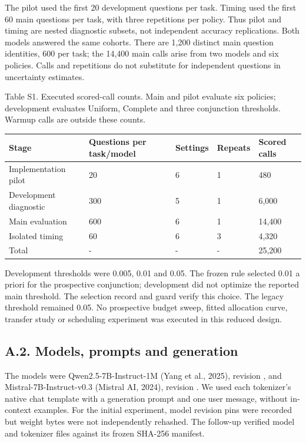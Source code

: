 \documentclass[
  12pt,
  a4paper,
]{article}
\begin{document}
The pilot used the first 20 development questions per task. Timing used
the first 60 main questions per task, with three repetitions per policy.
Thus pilot and timing are nested diagnostic subsets, not independent
accuracy replications. Both models answered the same cohorts. There are
1,200 distinct main question identities, 600 per task; the 14,400 main
calls arise from two models and six policies. Calls and repetitions do
not substitute for independent questions in uncertainty estimates.

Table S1. Executed scored-call counts. Main and pilot evaluate six
policies; development evaluates Uniform, Complete and three conjunction
thresholds. Warmup calls are outside these counts.

\begin{longtable}[]{@{}lllll@{}}
\toprule\noalign{}
Stage & Questions per task/model & Settings & Repeats & Scored calls \\
\midrule\noalign{}
\endhead
\bottomrule\noalign{}
\endlastfoot
Implementation pilot & 20 & 6 & 1 & 480 \\
Development diagnostic & 300 & 5 & 1 & 6,000 \\
Main evaluation & 600 & 6 & 1 & 14,400 \\
Isolated timing & 60 & 6 & 3 & 4,320 \\
Total & - & - & - & 25,200 \\
\end{longtable}

Development thresholds were 0.005, 0.01 and 0.05. The frozen rule
selected 0.01 a priori for the prospective conjunction; development did
not optimize the reported main threshold. The selection record and guard
verify this choice. The legacy threshold remained 0.05. No prospective
budget sweep, fitted allocation curve, transfer study or scheduling
experiment was executed in this reduced design.

\subsection{A.2. Models, prompts and
generation}\label{a.2.-models-prompts-and-generation}

The models were Qwen2.5-7B-Instruct-1M (Yang et al., 2025), revision
\texttt{}, and
Mistral-7B-Instruct-v0.3 (Mistral AI, 2024), revision
\texttt{}. We used each
tokenizer's native chat template with a generation prompt and one user
message, without in-context examples. For the initial experiment, model
revision pins were recorded but weight bytes were not independently
rehashed. The follow-up verified model and tokenizer files against its
frozen SHA-256 manifest.
\end{document}
